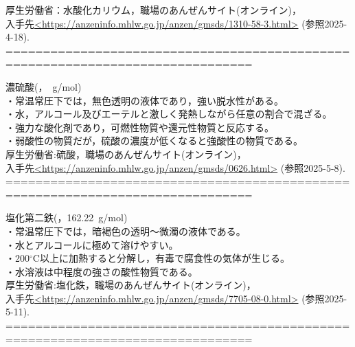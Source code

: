   厚生労働省：水酸化カリウム，職場のあんぜんサイト(オンライン)，\\
           入手先\url{<https://anzeninfo.mhlw.go.jp/anzen/gmsds/1310-58-3.html>}
           (参照2025-4-18).
===============================================================================
\item 濃硫酸(，\ g/mol)\cite{7}\\
                    \hspace{0pt}・常温常圧下では，無色透明の液体であり，強い脱水性がある。\\
                    \hspace{0pt}・水，アルコール及びエーテルと激しく発熱しながら任意の割合で混ざる。\\
                    \hspace{0pt}・強力な酸化剤であり，可燃性物質や還元性物質と反応する。\\
                    \hspace{0pt}・弱酸性の物質だが，硫酸の濃度が低くなると強酸性の物質である。\\
  厚生労働省:硫酸，職場のあんぜんサイト(オンライン)，\\
                         入手先\url{<https://anzeninfo.mhlw.go.jp/anzen/gmsds/0626.html>}
                         (参照2025-5-8).
===============================================================================                         
\item 塩化第二鉄(，162.22\ g/mol)\cite{12}\\
                    \hspace{0pt}・常温常圧下では，暗褐色の透明〜微濁の液体である。\\
                    \hspace{0pt}・水とアルコールに極めて溶けやすい。\\
                    \hspace{0pt}・200${}^\circ$C以上に加熱すると分解し，有毒で腐食性の気体が生じる。\\
                    \hspace{0pt}・水溶液は中程度の強さの酸性物質である。\\
  厚生労働省:塩化鉄，職場のあんぜんサイト(オンライン)，\\
                         入手先\url{<https://anzeninfo.mhlw.go.jp/anzen/gmsds/7705-08-0.html>}
                         (参照2025-5-11).
===============================================================================
